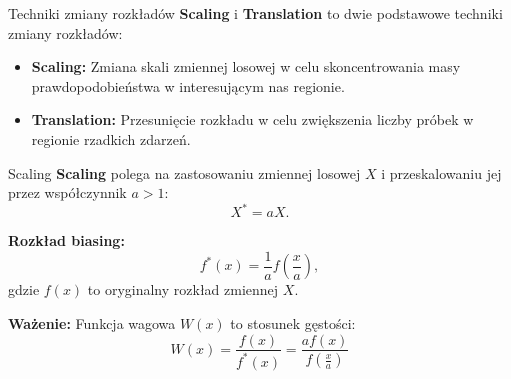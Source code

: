 \documentclass{beamer}
\begin{document}




\begin{frame}{Techniki zmiany rozkładów}
    \vspace{0.5cm}
    \textbf{Scaling} i \textbf{Translation} to dwie podstawowe techniki zmiany rozkładów:
    \begin{itemize}
        \item \textbf{Scaling:} Zmiana skali zmiennej losowej w celu skoncentrowania masy prawdopodobieństwa w interesującym nas regionie.
        \item \textbf{Translation:} Przesunięcie rozkładu w celu zwiększenia liczby próbek w regionie rzadkich zdarzeń.
    \end{itemize}
\end{frame}

\begin{frame}{Scaling}
    \textbf{Scaling} polega na zastosowaniu zmiennej losowej $X$ i przeskalowaniu jej przez współczynnik $a > 1$:
    \[
    X^* = aX.
    \]

    \textbf{Rozkład biasing:}
    \[
    f^*(x) = \frac{1}{a}f\left(\frac{x}{a}\right),
    \]
    gdzie $f(x)$ to oryginalny rozkład zmiennej $X$.

    \vspace{0.5cm}
    \textbf{Ważenie:} Funkcja wagowa $W(x)$ to stosunek gęstości:
    \[
    W(x) = \frac{f(x)}{f^*(x)} = \frac{af(x)}{f(\frac{x}{a})}
    \]
\end{frame}
\end{document}
